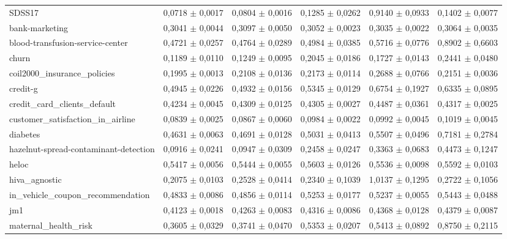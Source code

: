 \documentclass[11pt,a4paper]{article}
\begin{document}
\begin{table}[htbp]
{\begin{tabular}{@{}lrrrrr@{}}
        SDSS17 & 0,0718 $\pm$ 0,0017 & 0,0804 $\pm$ 0,0016 & 0,1285 $\pm$ 0,0262 & 0,9140 $\pm$ 0,0933 & 0,1402 $\pm$ 0,0077 \\
        bank-marketing & 0,3041 $\pm$ 0,0044 & 0,3097 $\pm$ 0,0050 & 0,3052 $\pm$ 0,0023 & 0,3035 $\pm$ 0,0022 & 0,3064 $\pm$ 0,0035 \\
        blood-transfusion-service-center & 0,4721 $\pm$ 0,0257 & 0,4764 $\pm$ 0,0289 & 0,4984 $\pm$ 0,0385 & 0,5716 $\pm$ 0,0776 & 0,8902 $\pm$ 0,6603 \\
        churn & 0,1189 $\pm$ 0,0110 & 0,1249 $\pm$ 0,0095 & 0,2045 $\pm$ 0,0186 & 0,1727 $\pm$ 0,0143 & 0,2441 $\pm$ 0,0480 \\
        coil2000\_insurance\_policies & 0,1995 $\pm$ 0,0013 & 0,2108 $\pm$ 0,0136 & 0,2173 $\pm$ 0,0114 & 0,2688 $\pm$ 0,0766 & 0,2151 $\pm$ 0,0036 \\
        credit-g & 0,4945 $\pm$ 0,0226 & 0,4932 $\pm$ 0,0156 & 0,5345 $\pm$ 0,0129 & 0,6754 $\pm$ 0,1927 & 0,6335 $\pm$ 0,0895 \\
        credit\_card\_clients\_default & 0,4234 $\pm$ 0,0045 & 0,4309 $\pm$ 0,0125 & 0,4305 $\pm$ 0,0027 & 0,4487 $\pm$ 0,0361 & 0,4317 $\pm$ 0,0025 \\
        customer\_satisfaction\_in\_airline & 0,0839 $\pm$ 0,0025 & 0,0867 $\pm$ 0,0060 & 0,0984 $\pm$ 0,0022 & 0,0992 $\pm$ 0,0045 & 0,1019 $\pm$ 0,0045 \\
        diabetes & 0,4631 $\pm$ 0,0063 & 0,4691 $\pm$ 0,0128 & 0,5031 $\pm$ 0,0413 & 0,5507 $\pm$ 0,0496 & 0,7181 $\pm$ 0,2784 \\
        hazelnut-spread-contaminant-detection & 0,0916 $\pm$ 0,0241 & 0,0947 $\pm$ 0,0309 & 0,2458 $\pm$ 0,0247 & 0,3363 $\pm$ 0,0683 & 0,4473 $\pm$ 0,1247 \\
        heloc & 0,5417 $\pm$ 0,0056 & 0,5444 $\pm$ 0,0055 & 0,5603 $\pm$ 0,0126 & 0,5536 $\pm$ 0,0098 & 0,5592 $\pm$ 0,0103 \\
        hiva\_agnostic & 0,2075 $\pm$ 0,0103 & 0,2528 $\pm$ 0,0414 & 0,2340 $\pm$ 0,1039 & 1,0137 $\pm$ 0,1295 & 0,2722 $\pm$ 0,1056 \\
        in\_vehicle\_coupon\_recommendation & 0,4833 $\pm$ 0,0086 & 0,4856 $\pm$ 0,0114 & 0,5253 $\pm$ 0,0177 & 0,5237 $\pm$ 0,0055 & 0,5443 $\pm$ 0,0488 \\
        jm1 & 0,4123 $\pm$ 0,0018 & 0,4263 $\pm$ 0,0083 & 0,4316 $\pm$ 0,0086 & 0,4368 $\pm$ 0,0128 & 0,4379 $\pm$ 0,0087 \\
        maternal\_health\_risk & 0,3605 $\pm$ 0,0329 & 0,3741 $\pm$ 0,0470 & 0,5353 $\pm$ 0,0207 & 0,5413 $\pm$ 0,0892 & 0,8750 $\pm$ 0,2115 \\

\end{tabular}}
\end{table}
\end{document}
